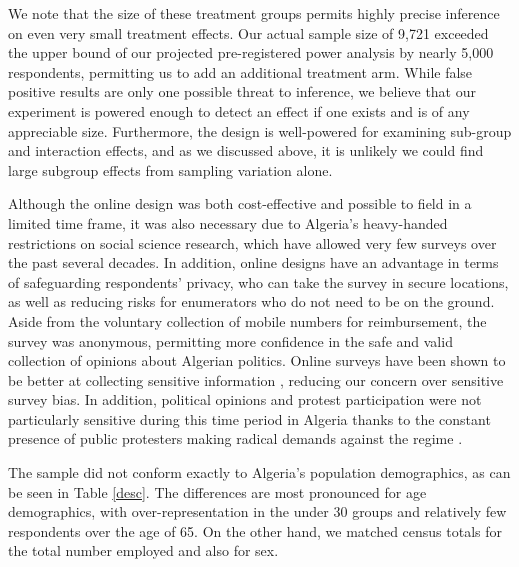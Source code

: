 \documentclass[12pt, letterpaper]{article}
\begin{document}
We note that the size of these treatment groups permits highly precise inference on even very small treatment effects. Our actual sample size of 9,721 exceeded the upper bound of our projected pre-registered power analysis by nearly 5,000 respondents, permitting us to add an additional treatment arm. While false positive results are only one possible threat to inference, we believe that our experiment is powered enough to detect an effect if one exists and is of any appreciable size. Furthermore, the design is well-powered for examining sub-group and interaction effects, and as we discussed above, it is unlikely we could find large subgroup effects from sampling variation alone.

Although the online design was both cost-effective and possible to field in a limited time frame, it was also necessary due to Algeria's heavy-handed restrictions on social science research, which have allowed very few surveys over the past several decades. In addition, online designs have an advantage in terms of safeguarding respondents' privacy, who can take the survey in secure locations, as well as reducing risks for enumerators who do not need to be on the ground. Aside from the voluntary collection of mobile numbers for reimbursement, the survey was anonymous, permitting more confidence in the safe and valid collection of opinions about Algerian politics. Online surveys have been shown to be better at collecting sensitive information \parencite{chang_comparing_2010}, reducing our concern over sensitive survey bias. In addition, political opinions and protest participation were not particularly sensitive during this time period in Algeria thanks to the constant presence of public protesters making radical demands against the regime \parencite{kuran_sparks_1989}. 


The sample did not conform exactly to Algeria's population demographics, as can be seen in Table \ref{desc}. The differences are most pronounced for age demographics, with over-representation in the under 30 groups and relatively few respondents over the age of 65. On the other hand, we matched census totals for the total number employed and also for sex.
\end{document}
